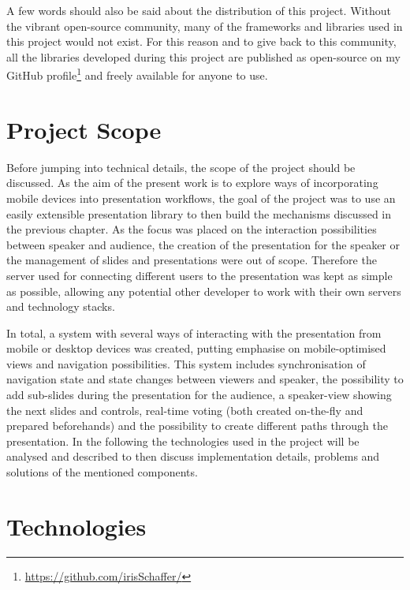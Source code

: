 A few words should also be said about the distribution of this project. Without the vibrant open-source community, many of the frameworks and libraries used in this project would not exist. For this reason and to give back to this community, all the libraries developed during this project are published as open-source on my GitHub profile\footnote{\href{https://github.com/irisSchaffer?tab=repositories}{\textsf{https://github.com/irisSchaffer/}}} and freely available for anyone to use.

\section{Project Scope}
\label{sec:implementation-scope}
Before jumping into technical details, the scope of the project should be discussed. As the aim of the present work is to explore ways of incorporating mobile devices into presentation workflows, the goal of the project was to use an easily extensible presentation library to then build the mechanisms discussed in the previous chapter.
As the focus was placed on the interaction possibilities between speaker and audience, the creation of the presentation for the speaker or the management of slides and presentations were out of scope. Therefore the server used for connecting different users to the presentation was kept as simple as possible, allowing any potential other developer to work with their own servers and technology stacks.

In total, a system with several ways of interacting with the presentation from mobile or desktop devices was created, putting emphasise on mobile-optimised views and navigation possibilities. This system includes synchronisation of navigation state and state changes between viewers and speaker, the possibility to add sub-slides during the presentation for the audience, a speaker-view showing the next slides and controls, real-time voting (both created on-the-fly and prepared beforehands) and the possibility to create different paths through the presentation. In the following the technologies used in the project will be analysed and described to then discuss implementation details, problems and solutions of the mentioned components.

\section{Technologies}
\label{sec:implementation-technologies}

